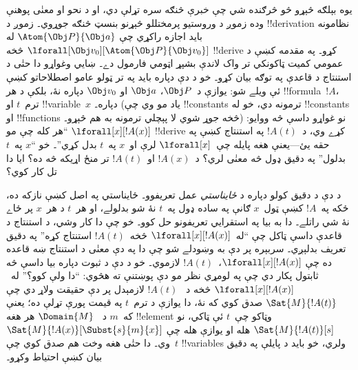 \documentclass[../../../include/open-logic-section]{subfiles}
\begin{document}


يوه بېلګه څېړو څو څرګنده شي چې خبرې څنګه سره تړلې دي، او د نحو او
معنٰی پوهنې وده زموږ د وروستيو پرمختللو څېړنو بنسټ څنګه جوړوي۔ زموږ
د !!{derivation} نظامونه بايد اجازه راکړي چې
$\Atom{\Obj P}{\Obj a}$ له
$\lforall[\Obj v_0][\Atom{\Obj P}{\Obj v_0}]$ څخه !!{derive} کړو۔
په مقدمه کښې د عمومي کميت ټاکونکي تر واک لاندې بشپړ اټومي فارمول دے۔
ښايي وغواړو دا
حتٰی د استنتاج د قاعدې په توګه بيان کړو۔ خو د دې دپاره بايد په تر
ټولو عامو اصطلاحاتو کښې ئې ويلے شو: يوازې د~$\Obj P$، $\Obj a$ او
$\Obj v_0$ دپاره نۀ، بلکې د هر !!{formula}~$!A$، ترم~$t$ او
!!{variable}~$x$ دپاره۔ (ياد مو وي چې !!{constant}s ترمونه دي، خو
له !!{constant}s او !!{function}s څخه جوړ شوي لا پېچلي ترمونه به هم
څېړو۔) نو غواړو داسې څه ووايو: ``هر کله چې مو
$\lforall[x][!A(x)]$ !!{derive} کړے وي، د~$!A(t)$ په استنتاج کښې په
حقه يئ---يعنې هغه پايله چې~$\lforall[x]$ لرې او~$x$ په~$t$ بدل
کړي''۔ خو ``$x$ په~$t$ بدلول'' په دقيق ډول څه معنٰی لري؟ د~$!A(x)$
او~$!A(t)$ تر منځ اړيکه څه ده؟ ايا دا تل کار کوي؟

د دې د دقيق کولو دپاره د \emph{ځايناستي} عمل تعريفوو۔ ځايناستي په
اصل کښې نازکه ده، ځکه په~$!A$ کښې ټول~$x$ ګانې په ساده ډول په~$t$
نۀ شو بدلولے، او هر~$t$ د هر~$x$ پر ځاے نۀ شي راتلے۔ دا به بيا په
استقرايي تعريفونو حل کوو۔ خو چې دا کار وشي، د استنتاج د قاعدې داسې
ټاکل چې ``له~$\lforall[x][!A(x)]$ څخه~$!A(t)$ استنتاج کړه'' په دقيق
تعريف بدلېږي۔ سربېره پر دې به وښودلے شو چې دا په دې معنٰی د
استنتاج ښه قاعده ده چې $\lforall[x][!A(x)]$،~$!A(t)$ لازموي۔ خو د
دې د ثبوت دپاره بيا داسې څه ثابتول پکار دي چې په لومړي نظر مو دې
پوښتنې ته هڅوي: ``دا ولې کوو؟'' له~$\lforall[x][!A(x)]$ څخه د
~$!A(t)$ لازمېدل پر دې حقيقت ولاړ دي چې $\Sat{M}{!A(t)}$ صدق کوي
که نۀ، دا يوازې د ترم~$t$ په قيمت پورې تړلې ده؛ يعنې که~$m$ د
~$\Domain{M}$ هر هغه !!{element} وټاکو چې~$t$ ئې ټاکي، نو
$\Sat{M}{!A(t)}[s]$ هله او يوازې هله چې
$\Sat{M}{!A(x)}[\Subst{s}{m}{x}]$ وي۔ دا حتٰی هغه وخت هم صدق کوي
چې~$t$ !!{variable}s ولري، خو بايد د پايلې په دقيق بيان کښې احتياط
وکړو۔
\end{document}

